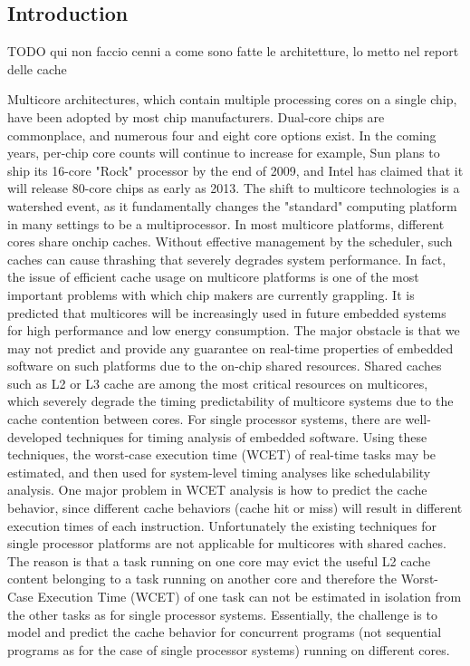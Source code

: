 \documentclass[a4paper,10pt]{article}
\begin{document}
\vspace{4ex}	%
\begin{multicols}{2}

\section{Introduction}

TODO qui non faccio cenni a come sono fatte le architetture, lo metto nel report delle cache

Multicore architectures, which contain multiple processing cores on a single chip, have been adopted by most chip manufacturers.
Dual-core chips are commonplace, and numerous four and eight core options exist. In the coming years, per-chip core counts will continue to
increase for example, Sun plans to ship its 16-core "Rock" processor by the end of 2009, and Intel has claimed that it will release 80-core
chips as early as 2013. The shift to multicore technologies is a watershed event, as it fundamentally changes the "standard" computing
platform in many settings to be a multiprocessor. In most multicore platforms, different cores share onchip caches. Without effective
management by the scheduler, such caches can cause thrashing that severely degrades system performance. In fact, the issue of efficient cache
usage on multicore platforms is one of the most important problems with which chip makers are currently grappling.
It is predicted that multicores will be increasingly used in future embedded systems for high performance and low energy consumption. The
major obstacle is that we may not predict and provide any guarantee on real-time properties of embedded software on such platforms due to the on-chip
shared resources. Shared caches such as L2 or L3 cache are among the most critical resources on multicores, which severely degrade the timing
predictability of multicore systems due to the cache contention between cores. For single processor systems, there are well-developed techniques 
for timing analysis of embedded software. Using these techniques, the worst-case execution time (WCET) of real-time tasks may be estimated, and
then used for system-level timing analyses like schedulability analysis. One major problem in WCET analysis is how to predict the cache behavior,
since different cache behaviors (cache hit or miss) will result in different execution times of each instruction.
Unfortunately the existing techniques for single processor platforms are not applicable for multicores with shared caches. The reason is
that a task running on one core may evict the useful L2 cache content belonging to a task running on another core and therefore the
Worst-Case Execution Time (WCET) of one task can not be estimated in isolation from the other tasks as for single processor systems. 
Essentially, the challenge is to model and predict the cache behavior for concurrent programs (not sequential programs as for the case of 
single processor systems) running on different cores.


\end{multicols}
\end{document}
